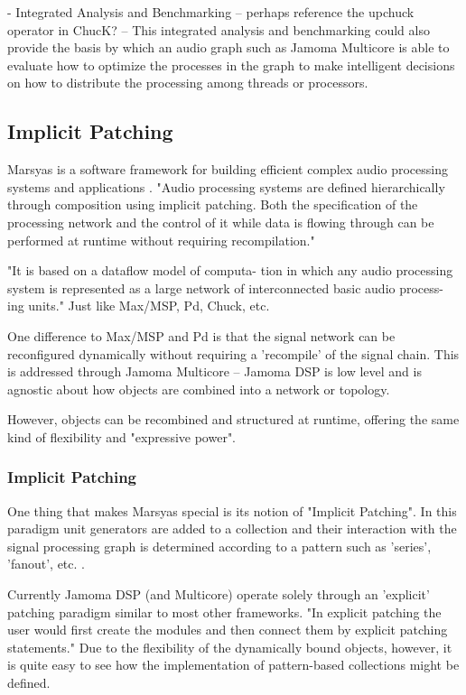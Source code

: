 \documentclass[twoside,a4paper]{article}
\begin{document}
- Integrated Analysis and Benchmarking -- perhaps reference the upchuck operator in ChucK?
   -- This integrated analysis and benchmarking could also provide the basis by which an audio graph such as Jamoma Multicore is able to evaluate how to optimize the processes in the graph to make intelligent decisions on how to distribute the processing among threads or processors.








\subsection{Implicit Patching} %

Marsyas is a software framework for building efficient complex audio processing systems and applications \cite{Tzanetakis:2008}. "Audio processing systems are defined hierarchically through composition using implicit patching. Both the specification of the processing network and the control of it while data is flowing through can be performed at runtime without requiring recompilation."

"It is based on a dataflow model of computa- tion in which any audio processing system is represented as a large network of interconnected basic audio process- ing units."  Just like Max/MSP, Pd, Chuck, etc.

One difference to Max/MSP and Pd is that the signal network can be reconfigured dynamically without requiring a 'recompile' of the signal chain.  This is addressed through Jamoma Multicore -- Jamoma DSP is low level and is agnostic about how objects are combined into a network or topology.

However, objects can be recombined and structured at runtime, offering the same kind of flexibility and "expressive power".

\subsubsection{Implicit Patching}

One thing that makes Marsyas special is its notion of "Implicit Patching".  In this paradigm unit generators are added to a collection and their interaction with the signal processing graph is determined according to a pattern such as 'series', 'fanout', etc. \cite{Bray:2005}.

Currently Jamoma DSP (and Multicore) operate solely through an 'explicit' patching paradigm similar to most other frameworks.  "In explicit patching the user would first create the modules and then connect them by explicit patching statements."  Due to the flexibility of the dynamically bound objects, however, it is quite easy to see how the implementation of pattern-based collections might be defined.
\end{document}
